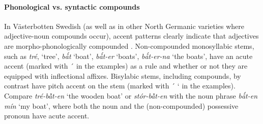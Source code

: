 \paragraph{Phonological vs. syntactic compounds}
In Västerbotten Swedish (as well as in other North Germanic varieties where adjective-noun compounds occur), accent patterns clearly indicate that adjectives are morpho-phonologically compounded \citep[cf.][]{dahl2003}. Non-compounded monosyllabic stems, such as \textit{tré}, ‘tree’, \textit{bǻt} ‘boat’, \textit{bǻt-er} ‘boats’, \textit{bǻt-er-na} ‘the boats’, have an acute accent (marked with ´ in the examples) as a rule and whether or not they are equipped with inflectional affixes. Bisylabic stems, including compounds, by contrast have pitch accent on the stem (marked with ´ ` in the examples). Compare \textit{tré-bå̀t-en} ‘the wooden boat’ or \textit{stór-bå̀t-en} with the noun phrase \textit{bǻt-en mín} ‘my boat’, where both the noun and the (non-compounded) possessive pronoun have acute accent.


